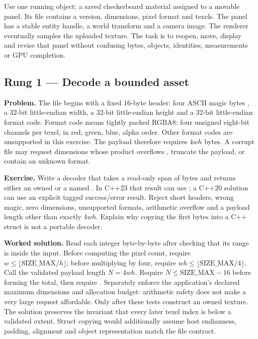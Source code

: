 Use one running object: a saved checkerboard material assigned to a movable panel. Its file contains a version, dimensions, pixel format and texels. The panel has a stable entity handle, a world transform and a camera image. The renderer eventually samples the uploaded texture. The task is to reopen, move, display and revise that panel without confusing bytes, objects, identities, measurements or GPU completion.

\subsection{Rung 1 --- Decode a bounded asset}\label{02-foundations-ii-ch038-rung-1-decode-a-bounded-asset}

\hypertarget{02-foundations-ii-ch038-rung-1-decode-a-bounded-asset}{}

\textbf{Problem.} The file begins with a fixed 16-byte header: four ASCII magic bytes , a 32-bit little-endian width, a 32-bit little-endian height and a 32-bit little-endian format code. Format code  means tightly packed RGBA8: four unsigned eight-bit channels per texel, in red, green, blue, alpha order. Other format codes are unsupported in this exercise. The payload therefore requires \(4wh\) bytes. A corrupt file may request dimensions whose product overflows , truncate the payload, or contain an unknown format.

\textbf{Exercise.} Write a decoder that takes a read-only span of bytes and returns either an owned  or a named . In C++23 that result can use ; a C++20 solution can use an explicit tagged success/error result. Reject short headers, wrong magic, zero dimensions, unsupported formats, arithmetic overflow and a payload length other than exactly \(4wh\). Explain why copying the first bytes into a C++ struct is not a portable decoder.

\textbf{Worked solution.} Read each integer byte-by-byte after checking that its range is inside the input. Before computing the pixel count, require \(w \le \lfloor\text{SIZE\_MAX}/h\rfloor\); before multiplying by four, require \(wh \le \lfloor\text{SIZE\_MAX}/4\rfloor\). Call the validated payload length \(N=4wh\). Require \(N\leq\mathrm{SIZE\_MAX}-16\) before forming the total, then require . Separately enforce the application's declared maximum dimensions and allocation budget: arithmetic safety does not make a very large request affordable. Only after these tests construct an owned texture. The solution preserves the invariant that every later texel index is below a validated extent. Struct copying would additionally assume host endianness, padding, alignment and object representation match the file contract.

